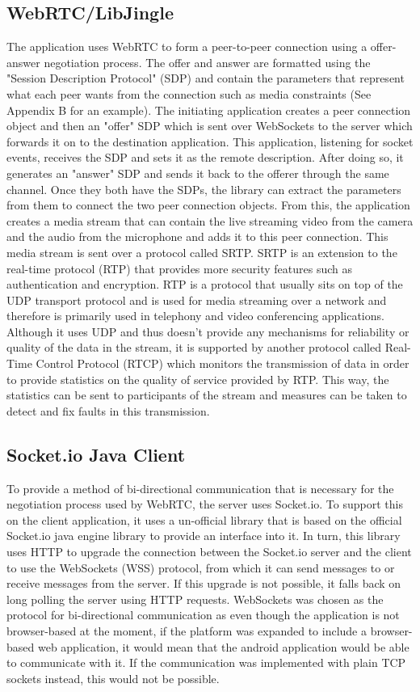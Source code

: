 \documentclass[]{report}
\begin{document}
			\subsection{WebRTC/LibJingle}
			The application uses WebRTC to form a peer-to-peer connection using a offer-answer negotiation process. The offer and answer are formatted using the "Session Description Protocol" (SDP) and contain the parameters that represent what each peer wants from the connection such as media constraints (See Appendix B for an example). The initiating application creates a peer connection object and then an "offer" SDP which is sent over WebSockets to the server which forwards it on to the destination application. This application, listening for socket events, receives the SDP and sets it as the remote description. After doing so, it generates an "answer" SDP and sends it back to the offerer through the same channel. Once they both have the SDPs, the library can extract the parameters from them to connect the two peer connection objects. From this, the application creates a media stream that can contain the live streaming video from the camera and the audio from the microphone and adds it to this peer connection. This media stream is sent over a protocol called SRTP. SRTP is an extension to the real-time protocol (RTP) that provides more security features such as authentication and encryption. RTP is a protocol that usually sits on top of the UDP transport protocol and is used for media streaming over a network and therefore is primarily used in telephony and video conferencing applications. Although it uses UDP and thus doesn't provide any mechanisms for reliability or quality of the data in the stream, it is supported by another protocol called Real-Time Control Protocol (RTCP) which monitors the transmission of data in order to provide statistics on the quality of service provided by RTP. This way, the statistics can be sent to participants of the stream and measures can be taken to detect and fix faults in this transmission. 
						
			
			\subsection{Socket.io Java Client}
			To provide a method of bi-directional communication that is necessary for the negotiation process used by WebRTC, the server uses Socket.io. To support this on the client application, it uses a un-official library that is based on the official Socket.io java engine library to provide an interface into it. In turn, this library uses HTTP to upgrade the connection between the Socket.io server and the client to use the WebSockets (WSS) protocol, from which it can send messages to or receive messages from the server. If this upgrade is not possible, it falls back on long polling the server using HTTP requests. WebSockets was chosen as the protocol for bi-directional communication as even though the application is not browser-based at the moment, if the platform was expanded to include a browser-based web application, it would mean that the android application would be able to communicate with it. If the communication was implemented with plain TCP sockets instead, this would not be possible.
		
\end{document}
